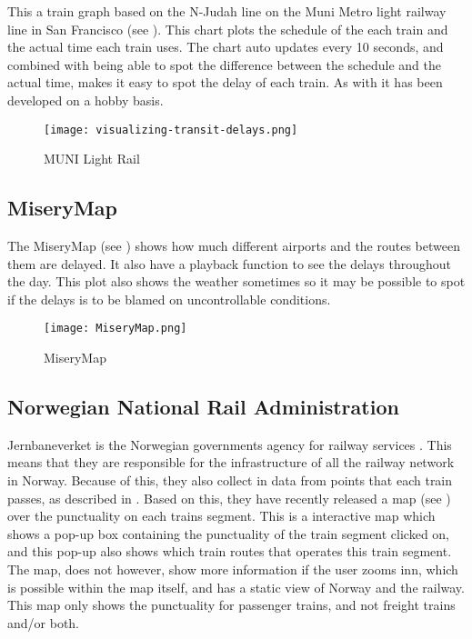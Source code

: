 This a train graph based on the N-Judah line on the Muni Metro light railway line in San Francisco (see ). 
This chart plots the schedule of the each train and the actual time each train 
uses. The chart auto updates every 10 seconds, and combined with being able 
to spot the difference between the schedule and the actual time, makes it easy 
to spot the delay of each train. As with 
it has been developed on a hobby basis.

\begin{figure}[!htbp]
	\texttt{[image: visualizing-transit-delays.png]}
	\caption[MUNI Light Rail]{MUNI Light Rail \cite{muniLightRail}}
	\label{fig:muniLightRail}
\end{figure}

\subsection{MiseryMap}
\label{sub:subsection_zugmonitor}

The MiseryMap (see ) shows how much different airports and 
the routes between them are delayed. It also have a playback function to see 
the delays throughout the day. This plot also shows the weather sometimes so it
may be possible to spot if the delays is to be blamed on uncontrollable
conditions. 

\begin{figure}[!htbp]
	\texttt{[image: MiseryMap.png]}
	\caption[MiseryMap]{MiseryMap \cite{flightAware:MiseryMap}}
	\label{fig:miserymap}
\end{figure}
 
\subsection{Norwegian National Rail Administration}
\label{sub:subsection_jernbaneverket}

Jernbaneverket is the Norwegian governments agency for railway services \cite{jernbaneverketAbout}.
This means that they are responsible for the infrastructure of all the railway network in Norway.
Because of this, they also collect in data from points that each train passes, as described in . 
Based on this, they have recently released a map (see ) over the punctuality on each trains segment. This is a 
interactive map which shows a pop-up box containing the punctuality of the 
train segment clicked on, and this pop-up also shows which train routes that
operates this train segment. The map, does not however, show more information if 
the user zooms inn, which is possible within the map itself, and has a static 
view of Norway and the railway. This map only shows the punctuality for 
passenger trains, and not freight trains and/or both.\\ 

